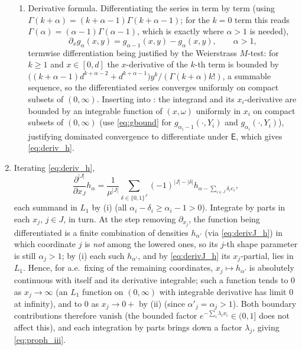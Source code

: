 \documentclass[12pt,a4paper]{article}
\makeatletter
\theoremstyle{definition}
\renewenvironment{proof}[1][\proofname]{\par
  \pushQED{\qed}%
  \normalfont \topsep6\p@\@plus6\p@\relax
  \trivlist
  \item[\hskip\labelsep\bfseries #1\@addpunct{.}]\ignorespaces
}{%
  \popQED\endtrivlist\@endpefalse
}
\newcommand{\EE}{\mathsf{E}}
\makeatother
\begin{document}
\begin{proof}
\begin{enumerate}[label=(\roman*)]
\begin{enumerate}
        \item Derivative formula.  Differentiating the series in
           term by term (using
          $\Gamma(k+\alpha)=(k+\alpha-1)\Gamma(k+\alpha-1)$; for the
          $k=0$ term this reads $\Gamma(\alpha)=(\alpha-1)\Gamma(\alpha-1)$,
          which is exactly where $\alpha>1$ is needed),
          \begin{equation}\label{eq:g_deriv}
            \partial_x g_\alpha(x,y)=g_{\alpha-1}(x,y)-g_\alpha(x,y),
            \qquad\alpha>1,
          \end{equation}
          termwise differentiation being justified by the Weierstrass
          $M$-test: for $k\geqslant1$ and $x\in[0,d]$ the $x$-derivative of
          the $k$-th term is bounded by
          $\bigl((k+\alpha-1)d^{k+\alpha-2}+d^{k+\alpha-1}\bigr)y^k/(\Gamma(k+\alpha)k!)$,
          a summable sequence, so the differentiated series converges
          uniformly on compact subsets of $(0,\infty)$.  Inserting into
          : the integrand and its $x_i$-derivative are
          bounded by an integrable function of $(x,\omega)$ uniformly in
          $x_i$ on compact subsets of $(0,\infty)$ (use \eqref{eq:gbound}
          for $g_{\alpha_i-1}(\cdot,Y_i)$ and $g_{\alpha_i}(\cdot,Y_i)$),
          justifying dominated convergence to differentiate under $\EE$,
          which gives \eqref{eq:deriv_h}.
      \end{enumerate}

    \item Iterating \eqref{eq:deriv_h},
      \begin{equation}\label{eq:derivJ_h}
        \frac{\partial^{|J|}}{\partial x_J}h_\alpha
        =\frac{1}{\mu^{|J|}}\sum_{\delta\in\{0,1\}^J}(-1)^{|J|-|\delta|}
          h_{\alpha-\sum_{i\in J}\delta_ie_i},
      \end{equation}
      each summand in $L_1$ by (i) (all $\alpha_i-\delta_i\geqslant\alpha_i-1>0$).
      Integrate by parts in each $x_j$, $j\in J$, in turn.  At the step
      removing $\partial_{x_j}$, the function being differentiated is a
      finite combination of densities $h_{\alpha'}$ (via
      \eqref{eq:derivJ_h}) in which coordinate $j$ is \emph{not} among
      the lowered ones, so its $j$-th shape parameter is still
      $\alpha_j>1$; by (i) each such $h_{\alpha'}$, and by
      \eqref{eq:derivJ_h} its $x_j$-partial, lies in $L_1$.  Hence, for
      a.e.\ fixing of the remaining coordinates, $x_j\mapsto h_{\alpha'}$
      is absolutely continuous with itself and its derivative integrable;
      such a function tends to $0$ as $x_j\to\infty$ (an $L_1$ function on
      $(0,\infty)$ with integrable derivative has limit $0$ at infinity),
      and to $0$ as $x_j\to 0+$ by (ii) (since $\alpha'_j=\alpha_j>1$).
      Both boundary contributions therefore vanish (the bounded factor
      $e^{-\sum_i\lambda_ix_i}\in(0,1]$ does not affect this), and each
      integration by parts brings down a factor $\lambda_j$, giving
      \eqref{eq:proph_iii}.
  \end{enumerate}
\end{proof}
\end{document}
